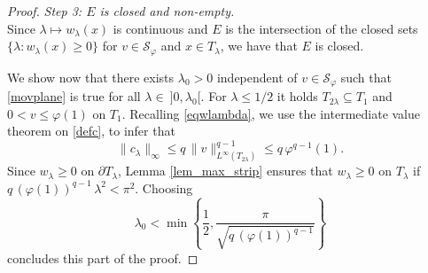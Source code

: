 \documentclass[12pt]{amsart}
\numberwithin{equation}{section}
\theoremstyle{plain}
\theoremstyle{plain}
\theoremstyle{plain}
\theoremstyle{definition}
\renewcommand{\le}{\leqslant}
\renewcommand{\ge}{\geqslant}
\newcommand{\cal}{\mathcal}
\begin{document}
\begin{proof}
\smallskip
 {\em Step 3: $E$ is closed and non-empty.}\\
Since $\lambda\mapsto w_{\lambda}(x)$ is continuous and $E$ is the intersection of the closed sets $\{\lambda: w_{\lambda}(x)\ge 0\}$ for $v\in {\cal S}_\varphi$ and $x\in T_{\lambda}$, we have that $E$ is closed.

We show now that there exists $\lambda_0>0$ independent of $v\in {\cal S}_{\varphi}$ such that \eqref{movplane} is true for all $\lambda\in \ ]0, \lambda_0[$. 
For $\lambda\le 1/2$ it holds $T_{2\lambda}\subseteq T_1$ and $0<v\le \varphi(1)$ on $T_{1}$. 
Recalling \eqref{eqwlambda}, we use the intermediate value theorem on \eqref{defc}, to infer that 
\[
\|c_\lambda\|_\infty\le q\, \|v\|^{q-1}_{L^\infty(T_{2\lambda})}\le q\, \varphi^{q-1}(1) .
\]
 Since $w_\lambda\ge 0$ on $\partial T_{\lambda}$, Lemma \ref{lem_max_strip} ensures that $w_\lambda\ge 0$ on $T_{\lambda}$ if $q\, (\varphi(1))^{q-1}\, \lambda^2<\pi^2$. 
Choosing 
 \[
 \lambda_0<\min\left\{\frac{1}{2}, \frac{\pi}{\sqrt{ q\, (\varphi(1))^{q-1}}}\right\}
 \]
 concludes this part of the proof.
 

\end{proof}
\end{document}
